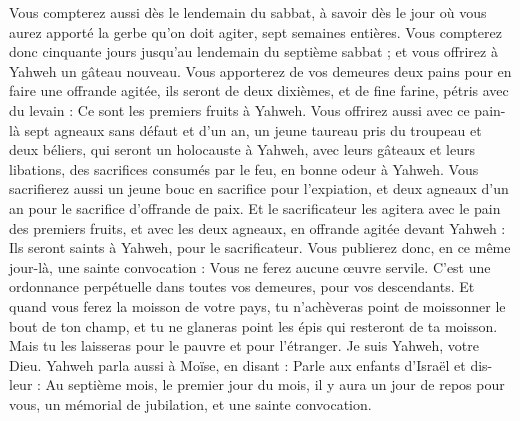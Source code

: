 \begin{multicols}{2}
Vous compterez aussi dès le lendemain du sabbat, à savoir dès le jour où vous aurez apporté la gerbe qu'on doit agiter, sept semaines entières.
Vous compterez donc cinquante jours jusqu'au lendemain du septième sabbat ; et vous offrirez à Yahweh un gâteau nouveau.
Vous apporterez de vos demeures deux pains pour en faire une offrande agitée, ils seront de deux dixièmes, et de fine farine, pétris avec du levain : Ce sont les premiers fruits à Yahweh.
Vous offrirez aussi avec ce pain-là sept agneaux sans défaut et d'un an, un jeune taureau pris du troupeau et deux béliers, qui seront un holocauste à Yahweh, avec leurs gâteaux et leurs libations, des sacrifices consumés par le feu, en bonne odeur à Yahweh.
Vous sacrifierez aussi un jeune bouc en sacrifice pour l'expiation, et deux agneaux d'un an pour le sacrifice d'offrande de paix.
Et le sacrificateur les agitera avec le pain des premiers fruits, et avec les deux agneaux, en offrande agitée devant Yahweh : Ils seront saints à Yahweh, pour le sacrificateur.
Vous publierez donc, en ce même jour-là, une sainte convocation : Vous ne ferez aucune œuvre servile. C'est une ordonnance perpétuelle dans toutes vos demeures, pour vos descendants.
Et quand vous ferez la moisson de votre pays, tu n'achèveras point de moissonner le bout de ton champ, et tu ne glaneras point les épis qui resteront de ta moisson. Mais tu les laisseras pour le pauvre et pour l'étranger. Je suis Yahweh, votre Dieu.
Yahweh parla aussi à Moïse, en disant :
Parle aux enfants d'Israël et dis-leur : Au septième mois, le premier jour du mois, il y aura un jour de repos pour vous, un mémorial de jubilation, et une sainte convocation.

\end{multicols}
